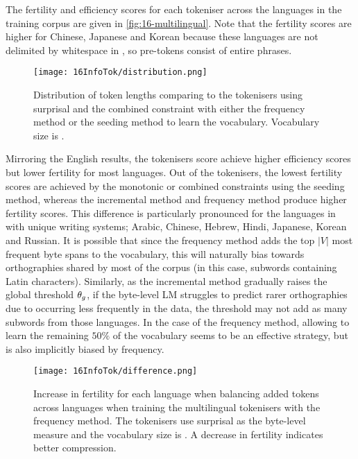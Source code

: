 The fertility and \renyi efficiency scores for each tokeniser across the  languages in the training corpus are given in \cref{fig:16-multilingual}. Note that the fertility scores are higher for Chinese, Japanese and Korean because these languages are not delimited by whitespace in \commoncorpus, so pre-tokens consist of entire phrases. 

\begin{figure}[!t]
    \centering
    \texttt{[image: 16InfoTok/distribution.png]}
    \caption{Distribution of token lengths comparing \bpewp to the \tokname tokenisers using surprisal and the combined constraint with either the frequency method or the seeding method to learn the vocabulary. Vocabulary size is .}
    \label{fig:16-distribution}
\end{figure}

Mirroring the English results, the \tokname tokenisers score achieve higher \renyi efficiency scores but lower fertility for most languages. Out of the \tokname tokenisers, the lowest fertility scores are achieved by the monotonic or combined constraints using the seeding method, whereas the incremental method and frequency method produce higher fertility scores. This difference is particularly pronounced for the languages in \commoncorpus with unique writing systems; Arabic, Chinese, Hebrew, Hindi, Japanese, Korean and Russian. It is possible that since the frequency method adds the top $|V|$ most frequent byte spans to the vocabulary, this will naturally bias towards orthographies shared by most of the corpus (in this case, subwords containing Latin characters). Similarly, as the incremental method gradually raises the global threshold $\theta_g$, if the byte-level LM struggles to predict rarer orthographies due to occurring less frequently in the data, the threshold may not add as many subwords from those languages. In the case of the frequency method, allowing \bpe to learn the remaining $50\%$ of the vocabulary seems to be an effective strategy, but \bpe is also implicitly biased by frequency.

\begin{figure}[!t]
    \centering
    \texttt{[image: 16InfoTok/difference.png]}
    \caption{Increase in fertility for each language when balancing added tokens across languages when training the multilingual \tokname tokenisers with the frequency method. The tokenisers use surprisal as the byte-level measure and the vocabulary size is . A decrease in fertility indicates better compression.}
    \label{fig:16-difference}
\end{figure}

